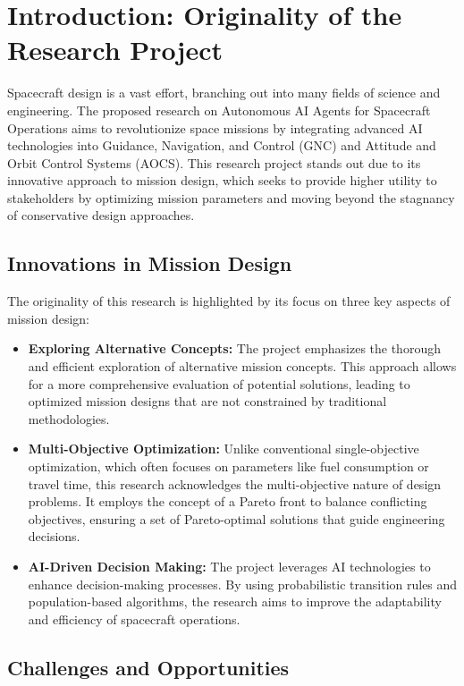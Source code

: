 \documentclass[a4paper, 11pt]{article}
\begin{document}
\section{Introduction: Originality of the Research Project}

Spacecraft design is a vast effort, branching out into many fields of science and engineering. The proposed research on Autonomous AI Agents for Spacecraft Operations aims to revolutionize space missions by integrating advanced AI technologies into Guidance, Navigation, and Control (GNC) and Attitude and Orbit Control Systems (AOCS). This research project stands out due to its innovative approach to mission design, which seeks to provide higher utility to stakeholders by optimizing mission parameters and moving beyond the stagnancy of conservative design approaches.

\subsection{Innovations in Mission Design}

The originality of this research is highlighted by its focus on three key aspects of mission design:

\begin{itemize}
    \item \textbf{Exploring Alternative Concepts:} The project emphasizes the thorough and efficient exploration of alternative mission concepts. This approach allows for a more comprehensive evaluation of potential solutions, leading to optimized mission designs that are not constrained by traditional methodologies.
    \item \textbf{Multi-Objective Optimization:} Unlike conventional single-objective optimization, which often focuses on parameters like fuel consumption or travel time, this research acknowledges the multi-objective nature of design problems. It employs the concept of a Pareto front to balance conflicting objectives, ensuring a set of Pareto-optimal solutions that guide engineering decisions.
    \item \textbf{AI-Driven Decision Making:} The project leverages AI technologies to enhance decision-making processes. By using probabilistic transition rules and population-based algorithms, the research aims to improve the adaptability and efficiency of spacecraft operations.
\end{itemize}

\subsection{Challenges and Opportunities}
\end{document}
